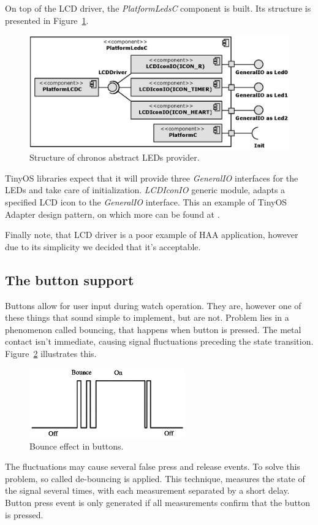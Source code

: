 On top of the LCD driver, the \emph{PlatformLedsC} component is built. Its structure is presented in Figure~\ref{fig:platform_leds_c}.
\begin{figure}[h]
  \centering
  \includegraphics{diagrams/platform_leds_c.eps}
  \caption{Structure of chronos abstract LEDs provider.}
  \label{fig:platform_leds_c}
\end{figure}
TinyOS libraries expect that it will provide three \emph{GeneralIO} interfaces for the LEDs and take care of initialization. \emph{LCDIconIO} generic module, adapts a specified LCD icon to the \emph{GeneralIO} interface. This an example of TinyOS Adapter design pattern, on which more can be found at \cite[ch. 8]{TOSProg}.

Finally note, that LCD driver is a poor example of HAA application, however due to its simplicity we decided that it's acceptable.

\subsection{The button support}

Buttons allow for user input during watch operation. They are, however one of these things that sound simple to implement, but are not. Problem lies in a phenomenon called bouncing, that happens when button is pressed. The metal contact isn't immediate, causing signal fluctuations preceding the state transition. Figure~\ref{fig:bouncing} illustrates this.
\begin{figure}[h]
  \centering
  \includegraphics[width=0.6\textwidth]{img/Bounce.eps}
  \caption{Bounce effect in buttons.}
  \label{fig:bouncing}
\end{figure}
The fluctuations may cause several false press and release events. To solve this problem, so called de-bouncing is applied. This technique, measures the state of the signal several times, with each measurement separated by a short delay. Button press event is only generated if all measurements confirm that the button is pressed.

